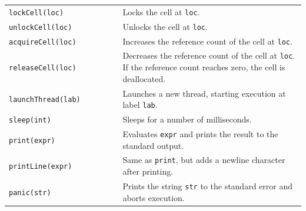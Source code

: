 \begin{table}
\begin{tabular}{p{0.385\linewidth} p{0.61\linewidth}}
\texttt{lockCell(loc)} &
Locks the cell at \texttt{loc}. \\

\texttt{unlockCell(loc)} &
Unlocks the cell at \texttt{loc}. \\

\texttt{acquireCell(loc)} &
Increases the reference count of the cell at \texttt{loc}. \\

\texttt{releaseCell(loc)} &
Decreases the reference count of the cell at \texttt{loc}. If the reference count reaches zero, the cell is deallocated. \\

\texttt{launchThread(lab)} &
Launches a new thread, starting execution at label \texttt{lab}. \\

\texttt{sleep(int)} &
Sleeps for a number of milliseconds. \\

\texttt{print(expr)} &
Evaluates \texttt{expr} and prints the result to the standard output. \\

\texttt{printLine(expr)} &
Same as \texttt{print}, but adds a newline character after printing. \\

\texttt{panic(str)} &
Prints the string \texttt{str} to the standard error and aborts execution. \\

\hline
\end{tabular}
\end{table}

